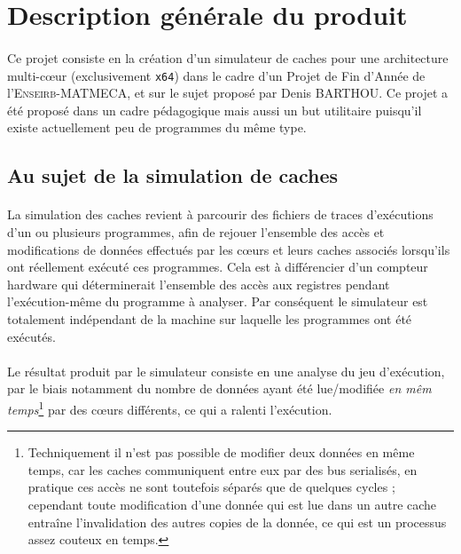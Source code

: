 \section{Description générale du produit}

\paragraph{}
Ce projet consiste en la création d'un simulateur de caches pour une architecture multi-c\oe ur (exclusivement \verb!x64!) dans le cadre d'un Projet de Fin d'Année de l'\textsc{Enseirb-MATMECA}, et sur le sujet proposé par Denis BARTHOU. Ce projet a été proposé dans un cadre pédagogique mais aussi un but utilitaire puisqu'il existe actuellement peu de programmes du même type.

\subsection{Au sujet de la simulation de caches}

\paragraph{}
La simulation des caches revient à parcourir des fichiers de traces d'exécutions d'un ou plusieurs programmes, afin de rejouer l'ensemble des accès et modifications de données effectués par les c\oe urs et leurs caches associés lorsqu'ils ont réellement exécuté ces programmes. Cela est à différencier d'un compteur hardware qui déterminerait l'ensemble des accès aux registres pendant l'exécution-même du programme à analyser. Par conséquent le simulateur est totalement indépendant de la machine sur laquelle les programmes ont été exécutés.   

\paragraph{}
Le résultat produit par le simulateur consiste en une analyse du jeu d'exécution, par le biais notamment du nombre de données ayant été lue/modifiée \emph{en mêm temps}\footnote{Techniquement il n'est pas possible de modifier deux données en même temps, car les caches communiquent entre eux par des bus serialisés, en pratique ces accès ne sont toutefois séparés que de quelques cycles ; cependant toute modification d'une donnée qui est lue dans un autre cache entraîne l'invalidation des autres copies de la donnée, ce qui est un processus assez couteux en temps.} par des c\oe urs différents, ce qui a ralenti l'exécution.

